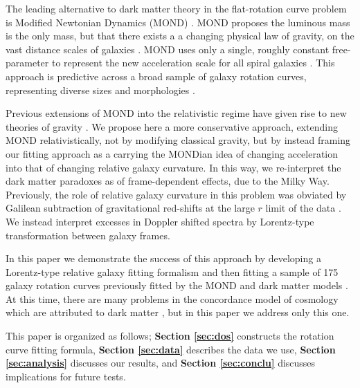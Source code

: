 \documentclass[reprint,%
 amsmath,amssymb,
 aps,
]{revtex4-1}
\begin{document}
  
 
     The leading   alternative    to dark matter theory  in the flat-rotation curve problem is   Modified Newtonian Dynamics (MOND) \cite{Milgrom}.  
     MOND    proposes    the   luminous mass is the only mass, but that there exists a 
     a changing  physical law of gravity,    on the vast distance scales of galaxies \cite{McGaugh_2014}. 
MOND uses only   a single, roughly constant free-parameter to represent the new acceleration scale for all spiral   galaxies  \cite{McGaugh2016RAR,2022A&A...664A..40M}. 
    This approach  is   predictive across a  broad  sample of galaxy rotation curves,  representing diverse    sizes and morphologies \cite{2016Lelli}.  
  
  
  Previous extensions of MOND into the relativistic regime have given rise to  new theories of gravity  \cite{PhysRevD.70.083509,doi:10.1142/S0217751X0703666X,Famaey2012}.  
  We    propose here  a more conservative approach,   extending MOND relativistically, not by modifying classical gravity,  but by instead framing  our fitting approach as a carrying the MONDian idea of changing acceleration into  that of changing relative galaxy curvature. 
 In this way,  we      re-interpret the dark matter paradoxes   as    of  frame-dependent effects,   due to the Milky Way.
   Previously, the role of relative
     galaxy curvature  in this problem was obviated 
       by  Galilean subtraction of   gravitational red-shifts at the  large $r$  limit of the data \citep{MTW}. We instead interpret excesses in Doppler shifted spectra by  Lorentz-type transformation between galaxy frames.
       
       
  In this paper we   demonstrate the success of this approach by developing a Lorentz-type relative galaxy fitting formalism and then fitting   a sample of 175 galaxy rotation curves previously fitted by the MOND and dark matter models  \cite{McGaugh2016RAR,2016Lelli,McGaugh_2014,Li_2018}.  
       At this time, there are many problems in   the concordance model of   cosmology which are attributed to dark matter \cite{2010dmp..book.....S,Tully:2014gfa,Naidu_2022}, but in
 this paper we address only this  one.  
  
 
 
 
This paper  is organized as follows;
{\bf Section \ref{sec:dos}} constructs  the rotation curve  fitting formula, 
{\bf Section \ref{sec:data}}   describes  the data we use, 
 {\bf Section \ref{sec:analysis}}   discusses our results, 
 and  {\bf Section \ref{sec:conclu}}   discusses implications for future tests.   
  
\end{document}
